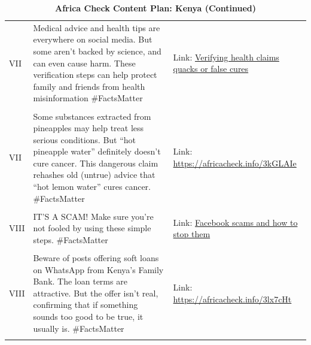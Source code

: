 	\begin{table}[ht]
		\centering
  \caption{\textbf{Africa Check Content Plan: Kenya  (Continued)} \label{tab:KE_3}}
		\begin{tabular}{|p{1cm}|p{7cm}|p{5cm}|}
			\hline
   VII & Medical advice and health tips are everywhere on social media. But some aren’t backed by science, and can even cause harm. These verification steps can help protect family and friends from health
misinformation
 \#FactsMatter & Link: \href{https://www.dropbox.com/s/b2bxkbjwtzp2xnr/Africa_Check_health.mp4?dl=0}{Verifying health claims quacks or false cures} \\ &  &\\
 VII & Some substances extracted from pineapples may help treat less serious conditions. But “hot pineapple water” definitely doesn’t cure cancer. This dangerous claim rehashes old (untrue) advice that “hot lemon water” cures cancer. \#FactsMatter
 & Link: \url{https://africacheck.info/3kGLAIe} \\ &  &\\
 VIII & IT’S A SCAM! Make sure you’re not fooled by using these simple steps.
 \#FactsMatter & Link: \href{https://www.dropbox.com/s/9gvyb2x4j09thiv/Africa_Check_facebook.mp4?dl=0}{Facebook scams and how to stop them} \\ &  &\\
 VIII & Beware of posts offering soft loans on WhatsApp from Kenya’s Family Bank. The loan terms are attractive. But the offer isn’t real, confirming that if something sounds too good to be true, it usually is. \#FactsMatter
 & Link: \url{https://africacheck.info/3lx7cHt} \\ &  &\\
\hline 
   \end{tabular}
\end{table}

\newpage


